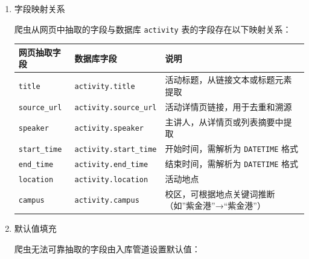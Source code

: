 \documentclass[UTF8,a4paper,12pt,fontset=none]{ctexrep}
\newcounter{none}
\begin{document}
\begin{enumerate}
\def\labelenumi{\arabic{enumi}.}
\item
  字段映射关系

  爬虫从网页中抽取的字段与数据库 \texttt{activity} 表的字段存在以下映射关系：

  {\def\LTcaptype{none} %
  \begin{longtable}[]{@{}
    >{\raggedright\arraybackslash}p{}
    >{\raggedright\arraybackslash}p{}
    >{\raggedright\arraybackslash}p{}@{}}
  \toprule\noalign{}
  \begin{minipage}[b]{\linewidth}\raggedright
  网页抽取字段
  \end{minipage} & \begin{minipage}[b]{\linewidth}\raggedright
  数据库字段
  \end{minipage} & \begin{minipage}[b]{\linewidth}\raggedright
  说明
  \end{minipage} \\
  \midrule\noalign{}
  \endhead
  \bottomrule\noalign{}
  \endlastfoot
  \texttt{title} & \texttt{activity.title} & 活动标题，从链接文本或标题元素提取 \\
  \texttt{source\_url} & \texttt{activity.source\_url} & 活动详情页链接，用于去重和溯源 \\
  \texttt{speaker} & \texttt{activity.speaker} & 主讲人，从详情页或列表摘要中提取 \\
  \texttt{start\_time} & \texttt{activity.start\_time} & 开始时间，需解析为 \texttt{DATETIME} 格式 \\
  \texttt{end\_time} & \texttt{activity.end\_time} & 结束时间，需解析为 \texttt{DATETIME} 格式 \\
  \texttt{location} & \texttt{activity.location} & 活动地点 \\
  \texttt{campus} & \texttt{activity.campus} & 校区，可根据地点关键词推断（如''紫金港''→``紫金港''） \\
  \end{longtable}
  }
\item
  默认值填充

  爬虫无法可靠抽取的字段由入库管道设置默认值：


\end{enumerate}
\end{document}
